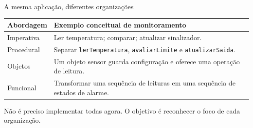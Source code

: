 \begin{frame}[t]{A mesma aplicação, diferentes organizações}
\small
\begin{tabularx}{\textwidth}{lX}\toprule
Abordagem & Exemplo conceitual de monitoramento\\\midrule
Imperativa & Ler temperatura; comparar; atualizar sinalizador.\\[0.15cm]
Procedural & Separar \texttt{lerTemperatura}, \texttt{avaliarLimite} e \texttt{atualizarSaida}.\\[0.15cm]
Objetos & Um objeto sensor guarda configuração e oferece uma operação de leitura.\\[0.15cm]
Funcional & Transformar uma sequência de leituras em uma sequência de estados de alarme.\\\bottomrule
\end{tabularx}
\medskip\par
Não é preciso implementar todas agora. O objetivo é reconhecer o foco de cada organização.
\end{frame}
